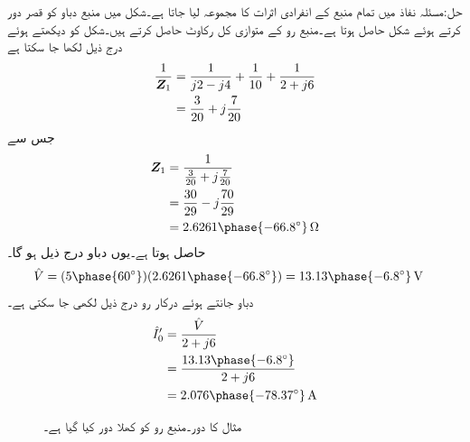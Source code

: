 حل:مسئلہ نفاذ میں تمام منبع کے انفرادی اثرات کا مجموعہ لیا جاتا ہے۔شکل  میں منبع دباو کو قصر دور کرتے ہوئے  شکل  حاصل ہوتا ہے۔منبع رو کے متوازی کل رکاوٹ  حاصل کرتے ہیں۔شکل کو دیکھتے ہوئے درج ذیل لکھا جا سکتا ہے
\begin{align*}
\frac{1}{{{\boldsymbol{Z}}}_1}&=\frac{1}{j2-j4}+\frac{1}{10}+\frac{1}{2+j6}\\
&=\frac{3}{20}+j\frac{7}{20}
\end{align*}
جس سے
\begin{align*}
\bZ_1&=\frac{1}{\frac{3}{20}+j\frac{7}{20}}\\
&=\frac{30}{29}-j\frac{70}{29}\\
&=2.6261\phase{-66.8^{\circ}} \, \si{\ohm}
\end{align*}
حاصل ہوتا ہے۔یوں دباو  درج ذیل ہو گا۔
\begin{align*}
\hat{V}&=(5\phase{60^{\circ}})(2.6261\phase{-66.8^{\circ}})=13.13\phase{-6.8^{\circ}}\,\si{\volt} 
\end{align*}
دباو جانتے ہوئے درکار رو درج ذیل لکھی جا سکتی ہے۔
\begin{gather}
\begin{aligned}\label{مساوات-بدلتا_منبع_رو_کی_رو}
\hat{I}'_0&=\frac{\hat{V}}{2+j6}\\
&=\frac{13.13\phase{-6.8^{\circ}}}{2+j6}\\
&=2.076\phase{-78.37^{\circ}} \, \si{\ampere}
\end{aligned}
\end{gather}
%
\begin{figure}
\centering
{}
\caption{مثال  کا دور۔منبع رو کو کھلا دور کیا گیا ہے۔}
\label{شکل_بدلتا_تراکیب_ت}
\end{figure}

